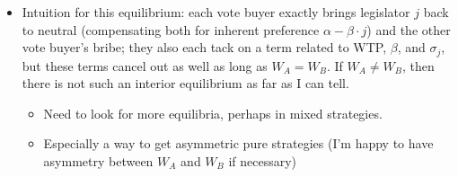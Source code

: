 \documentclass[12pt]{article}
\begin{document}
\begin{enumerate}
\begin{itemize}
\begin{itemize}
						\item Intuition for this equilibrium: each vote buyer exactly brings legislator $j$ back to neutral (compensating both for inherent preference $\alpha - \beta \cdot j$) and the other vote buyer's bribe; they also each tack on a term related to WTP, $\beta$, and $\sigma_j$, but these terms cancel out as well as long as $W_A = W_B$. If $W_A \neq W_B$, then there is not such an interior equilibrium as far as I can tell. 
							\begin{itemize}
								\item Need to look for more equilibria, perhaps in mixed strategies.
								\item Especially a way to get asymmetric pure strategies (I'm happy to have asymmetry between $W_A$ and $W_B$ if necessary)
							\end{itemize}
					\end{itemize}
		\end{itemize}
\end{enumerate}

\newpage
\end{document}
